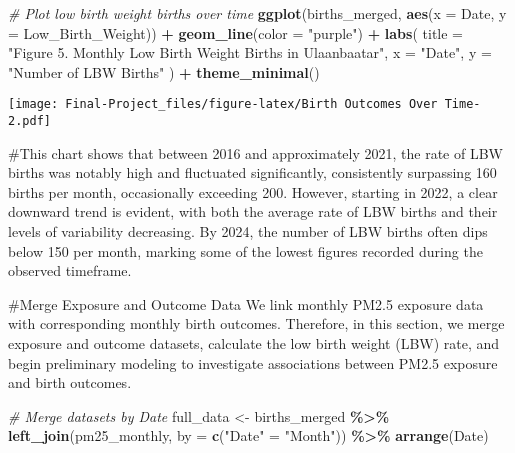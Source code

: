 \documentclass[
]{article}
\newenvironment{Shaded}{\begin{snugshade}}{\end{snugshade}}
\newcommand{\AttributeTok}[1]{\textcolor[rgb]{0.13,0.29,0.53}{#1}}
\newcommand{\CommentTok}[1]{\textcolor[rgb]{0.56,0.35,0.01}{\textit{#1}}}
\newcommand{\FunctionTok}[1]{\textcolor[rgb]{0.13,0.29,0.53}{\textbf{#1}}}
\newcommand{\NormalTok}[1]{#1}
\newcommand{\OtherTok}[1]{\textcolor[rgb]{0.56,0.35,0.01}{#1}}
\newcommand{\SpecialCharTok}[1]{\textcolor[rgb]{0.81,0.36,0.00}{\textbf{#1}}}
\newcommand{\StringTok}[1]{\textcolor[rgb]{0.31,0.60,0.02}{#1}}
\begin{document}
\begin{Shaded}
\begin{Highlighting}[]
\CommentTok{\# Plot low birth weight births over time}
\FunctionTok{ggplot}\NormalTok{(births\_merged, }\FunctionTok{aes}\NormalTok{(}\AttributeTok{x =}\NormalTok{ Date, }\AttributeTok{y =}\NormalTok{ Low\_Birth\_Weight)) }\SpecialCharTok{+}
  \FunctionTok{geom\_line}\NormalTok{(}\AttributeTok{color =} \StringTok{"purple"}\NormalTok{) }\SpecialCharTok{+}
  \FunctionTok{labs}\NormalTok{(}
    \AttributeTok{title =} \StringTok{"Figure 5. Monthly Low Birth Weight Births in Ulaanbaatar"}\NormalTok{,}
    \AttributeTok{x =} \StringTok{"Date"}\NormalTok{,}
    \AttributeTok{y =} \StringTok{"Number of LBW Births"}
\NormalTok{  ) }\SpecialCharTok{+}
  \FunctionTok{theme\_minimal}\NormalTok{()}
\end{Highlighting}
\end{Shaded}

\texttt{[image: Final-Project\_files/figure-latex/Birth Outcomes Over Time-2.pdf]}

\begin{Shaded}
\begin{Highlighting}[]
\NormalTok{\#This chart shows that between 2016 and approximately 2021, the rate of LBW births was notably high and fluctuated significantly, consistently surpassing 160 births per month, occasionally exceeding 200. However, starting in 2022, a clear downward trend is evident, with both the average rate of LBW births and their levels of variability decreasing. By 2024, the number of LBW births often dips below 150 per month, marking some of the lowest figures recorded during the observed timeframe.}
\end{Highlighting}
\end{Shaded}

\#Merge Exposure and Outcome Data We link monthly PM2.5 exposure data
with corresponding monthly birth outcomes. Therefore, in this section,
we merge exposure and outcome datasets, calculate the low birth weight
(LBW) rate, and begin preliminary modeling to investigate associations
between PM2.5 exposure and birth outcomes.

\begin{Shaded}
\begin{Highlighting}[]
\CommentTok{\# Merge datasets by Date}
\NormalTok{full\_data }\OtherTok{\textless{}{-}}\NormalTok{ births\_merged }\SpecialCharTok{\%\textgreater{}\%}
  \FunctionTok{left\_join}\NormalTok{(pm25\_monthly, }\AttributeTok{by =} \FunctionTok{c}\NormalTok{(}\StringTok{"Date"} \OtherTok{=} \StringTok{"Month"}\NormalTok{)) }\SpecialCharTok{\%\textgreater{}\%}
  \FunctionTok{arrange}\NormalTok{(Date)}
\end{Highlighting}
\end{Shaded}
\end{document}
